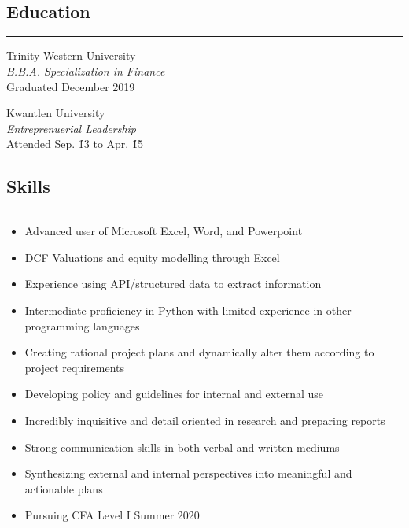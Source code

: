 \documentclass{article}
\newcommand{\bitem}{\item[$\bullet$]}
\begin{document}
\noindent\hrulefill\\
\\
\begin{minipage}[t]{0.35\textwidth}
\begin{center}
  \section*{Education}
\end{center}
\hrule
\vspace{5pt}
\large{Trinity Western University}\\
\normalsize\textit{B.B.A. Specialization in Finance}\\
Graduated December 2019\\
\vspace{2.5pt}

\large{Kwantlen University}\\
\normalsize\textit{Entreprenuerial Leadership}\\
Attended Sep. \'13 to Apr. \'15

\vspace{-15pt}
\begin{center}
  \item
  \section*{Skills}
\end{center}
\hrule
\vspace{5pt}
\begin{itemize}[leftmargin=*]\raggedright
  \bitem Advanced user of Microsoft Excel, Word, and Powerpoint
  \bitem DCF Valuations and equity modelling through Excel
  \bitem Experience using API/structured data to extract information
  \bitem Intermediate proficiency in Python with limited experience in other programming languages
  \bitem Creating rational project plans and dynamically alter them according to project requirements
  \bitem Developing policy and guidelines for internal and external use
  \bitem Incredibly inquisitive and detail oriented in research and preparing reports
  \bitem Strong communication skills in both verbal and written mediums
  \bitem Synthesizing external and internal perspectives into meaningful and actionable plans
  \bitem Pursuing CFA Level I Summer 2020
\end{itemize}

\end{minipage}
\end{document}
